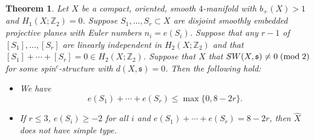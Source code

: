 \documentclass{amsart}
\newtheorem{theorem}{Theorem}[section]
\theoremstyle{definition}
\theoremstyle{remark}
\numberwithin{equation}{section}
\begin{document}
\begin{theorem}\label{thm:rpadj}
Let $X$ be a compact, oriented, smooth $4$-manifold with $b_+(X) > 1$ and $H_1(X ; \mathbb{Z}_2) = 0$. Suppose $S_1, \dots , S_r \subset X$ are disjoint smoothly embedded projective planes with Euler numbers $n_i = e(S_i)$. Suppose that any $r-1$ of $[S_1] , \dots , [S_r]$ are linearly independent in $H_2(X ; \mathbb{Z}_2)$ and that $[S_1] + \cdots + [S_r] = 0 \in H_2(X ; \mathbb{Z}_2)$. Suppose that $X$ that $SW(X , \mathfrak{s}) \neq 0 \; ({\rm mod} \; 2)$ for some spin$^c$-structure with $d(X , \mathfrak{s}) = 0$. Then the following hold:
\begin{itemize}
\item[(1)]{We have
\[
e(S_1) + \cdots + e(S_r) \le \max\{ 0 , 8-2r \}.
\]
}
\item[(2)]{If $r \le 3$, $e(S_i) \ge -2$ for all $i$ and $e(S_1) + \cdots + e(S_r) = 8-2r$, then $\widehat{X}$ does not have simple type.}
\end{itemize}
\end{theorem}
\end{document}
